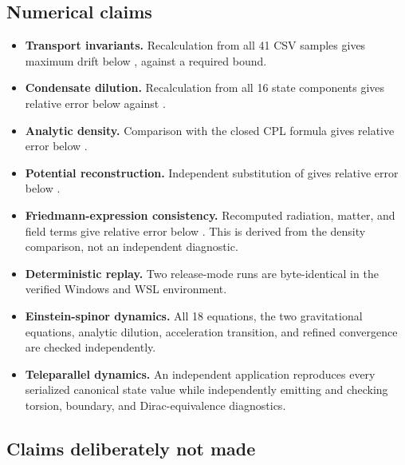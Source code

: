 \documentclass[11pt]{article}
\begin{document}
\subsection{Numerical claims}

\begin{itemize}
\item \textbf{Transport invariants.} Recalculation from all 41 CSV samples gives
maximum drift below \texttt{}, against a required \texttt{} bound.

\item \textbf{Condensate dilution.} Recalculation from all 16 state components gives
relative error below \texttt{} against \texttt{}.

\item \textbf{Analytic density.} Comparison with the closed CPL formula gives relative
error below \texttt{}.

\item \textbf{Potential reconstruction.} Independent substitution of \texttt{} gives
relative error below \texttt{}.

\item \textbf{Friedmann-expression consistency.} Recomputed radiation, matter, and
field terms give relative error below \texttt{}. This is derived from the density comparison, not an independent diagnostic.

\item \textbf{Deterministic replay.} Two release-mode runs are byte-identical in the
verified Windows and WSL environment.

\item \textbf{Einstein-spinor dynamics.} All 18 equations, the two gravitational
equations, analytic dilution, acceleration transition, and refined convergence are checked independently.

\item \textbf{Teleparallel dynamics.} An independent application reproduces every
serialized canonical state value while independently emitting and checking torsion, boundary, and Dirac-equivalence diagnostics.

\end{itemize}

\subsection{Claims deliberately not made}
\end{document}
